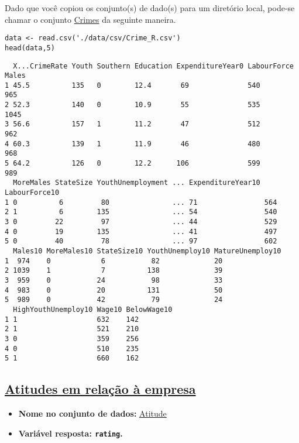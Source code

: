\documentclass[12pt]{article}
\begin{document}
Dado que você copiou os conjunto(s) de dado(s) para um diretório
local, pode-se chamar o conjunto \href{https://drive.google.com/file/d/1hZpHoEXbhZGvmtmrbcWpXYfBV-2ZD7uF/view?usp=sharing}{Crimes} da seguinte maneira.

\begin{verbatim}
data <- read.csv('./data/csv/Crime_R.csv')
head(data,5)
\end{verbatim}

\begin{verbatim}
  X...CrimeRate Youth Southern Education ExpenditureYear0 LabourForce Males
1 45.5          135   0        12.4       69              540          965 
2 52.3          140   0        10.9       55              535         1045 
3 56.6          157   1        11.2       47              512          962 
4 60.3          139   1        11.9       46              480          968 
5 64.2          126   0        12.2      106              599          989 
  MoreMales StateSize YouthUnemployment ... ExpenditureYear10 LabourForce10
1 0          6         80               ... 71                564          
2 1          6        135               ... 54                540          
3 0         22         97               ... 44                529          
4 0         19        135               ... 41                497          
5 0         40         78               ... 97                602          
  Males10 MoreMales10 StateSize10 YouthUnemploy10 MatureUnemploy10
1  974    0            6           82             20              
2 1039    1            7          138             39              
3  959    0           24           98             33              
4  983    0           20          131             50              
5  989    0           42           79             24              
  HighYouthUnemploy10 Wage10 BelowWage10
1 1                   632    142        
2 1                   521    210        
3 0                   359    256        
4 0                   510    235        
5 1                   660    162        
\end{verbatim}
\clearpage

\subsection{\href{https://r-data.pmagunia.com/dataset/r-dataset-package-datasets-attitude}{Atitudes em relação à empresa}}
\label{sec:org7675ac9}
\begin{itemize}
\item \textbf{Nome no conjunto de dados:} \href{https://drive.google.com/file/d/1rKj4NPD61bWKD6HBC4fux2Eit6CNEKwr/view?usp=sharing}{Atitude}
\item \textbf{Variável resposta: \texttt{rating}.}
\end{itemize}
\end{document}
